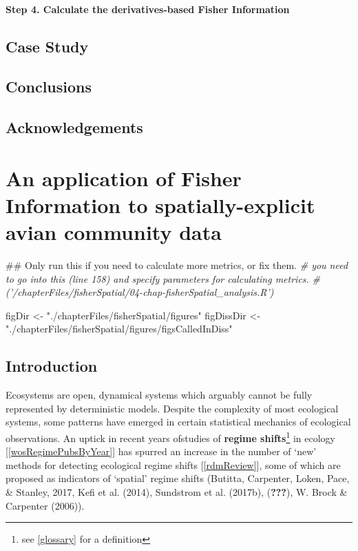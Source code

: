 \documentclass[12pt,twoside,openany]{reedthesis}
\newenvironment{Shaded}{\begin{snugshade}}{\end{snugshade}}
\newcommand{\StringTok}[1]{\textcolor[rgb]{0.31,0.60,0.02}{#1}}
\newcommand{\CommentTok}[1]{\textcolor[rgb]{0.56,0.35,0.01}{\textit{#1}}}
\newcommand{\NormalTok}[1]{#1}
\begin{document}
\subsubsection{\texorpdfstring{\textbf{Step 4.} Calculate the
derivatives-based Fisher
Information}{Step 4. Calculate the derivatives-based Fisher Information}}\label{step-4.-calculate-the-derivatives-based-fisher-information}

\section{Case Study}\label{case-study}

\section{Conclusions}\label{conclusions-1}

\section{Acknowledgements}\label{acknowledgements}

\chapter{An application of Fisher Information to spatially-explicit
avian community data}\label{fisherSpatial}
\begin{Shaded}
\begin{Highlighting}[]
\NormalTok{## Only run this if you need to calculate more metrics, or fix them.}
\CommentTok{# you need to go into this (line 158) and specify parameters for calculating metrics.}
\CommentTok{# ('/chapterFiles/fisherSpatial/04-chap-fisherSpatial_analysis.R')}
\end{Highlighting}
\end{Shaded}
\begin{Shaded}
\begin{Highlighting}[]
\NormalTok{figDir <-}\StringTok{ "./chapterFiles/fisherSpatial/figures"}
\NormalTok{figDissDir <-}\StringTok{ "./chapterFiles/fisherSpatial/figures/figsCalledInDiss"}
\end{Highlighting}
\end{Shaded}
\section{Introduction}\label{introduction-2}

Ecosystems are open, dynamical systems which arguably cannot be fully
represented by deterministic models. Despite the complexity of most
ecological systems, some patterns have emerged in certain statistical
mechanics of ecological observations. An uptick in recent years
ofstudies of \textbf{regime shifts}\footnote{see \ref{glossary} for a
  definition} in ecology {[}\ref{wosRegimePubsByYear}{]} has spurred an
increase in the number of `new' methods for detecting ecological regime
shifts {[}\ref{rdmReview}{]}, some of which are proposed as indicators
of `spatial' regime shifts (Butitta, Carpenter, Loken, Pace, \& Stanley,
2017, Kefi et al. (2014), Sundstrom et al. (2017b), ({\textbf{???}}), W.
Brock \& Carpenter (2006)).
\end{document}
